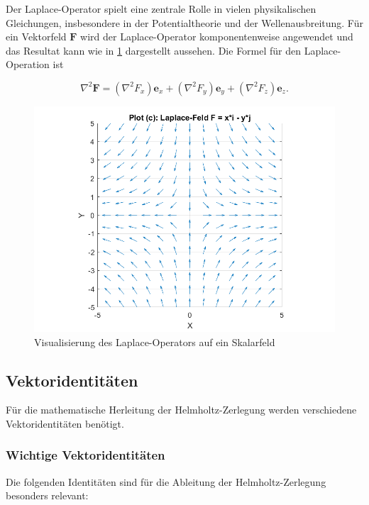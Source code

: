 Der Laplace-Operator spielt eine zentrale Rolle in vielen physikalischen Gleichungen, insbesondere in der Potentialtheorie und der Wellenausbreitung. Für ein Vektorfeld $\mathbf{F}$ wird der Laplace-Operator komponentenweise angewendet und das Resultat kann wie in \ref{fig:LaplaceAlg} dargestellt aussehen. Die Formel für den Laplace-Operation ist

\begin{equation}
\nabla^2 \mathbf{F} = (\nabla^2 F_x)\mathbf{e}_x + (\nabla^2 F_y)\mathbf{e}_y + (\nabla^2 F_z)\mathbf{e}_z.
\end{equation}

\begin{figure}[h!]
    \centering
    \includegraphics[scale=0.4]{papers/helmholtz/images/Laplace_Feld.png}
    \caption{Visualisierung des Laplace-Operators auf ein Skalarfeld}
    \label{fig:LaplaceAlg}
\end{figure}


\subsection{Vektoridentitäten
\label{helmholtz:subsection:Vektoridentitaeten}}
Für die mathematische Herleitung der Helmholtz-Zerlegung werden verschiedene Vektoridentitäten benötigt.

\subsubsection{Wichtige Vektoridentitäten}

Die folgenden Identitäten sind für die Ableitung der Helmholtz-Zerlegung besonders relevant:

